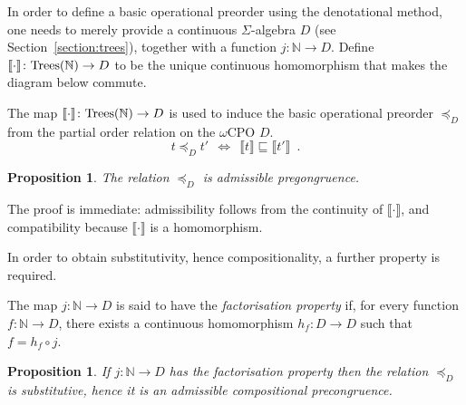 \documentclass[a4paper,UKenglish]{lipics-v2018}
\newcommand{\Trees}{\textnormal{Trees}}
\newcommand{\Basicleq}{\preccurlyeq}
\newcommand{\Sem}[1]{\llbracket #1 \rrbracket}
\theoremstyle{plain}
\newtheorem{proposition}[theorem]{Proposition}
\begin{document}
In order to define a basic operational preorder using the denotational method, one needs to merely provide
a continuous $\Sigma$-algebra $D$ (see Section~\ref{section:trees}),  together with a function
$j\colon \mathbb{N} \to D$. 
Define   $\llbracket \cdot \rrbracket \colon \Trees(\mathbb{N}) \to D$ to be the unique continuous homomorphism that makes the diagram below commute.
   \begin{center}
    \end{center}
\noindent
The map $\llbracket \cdot \rrbracket \colon \Trees(\mathbb{N}) \to D$ is used to induce
the basic operational preorder $\Basicleq_D$ from the partial order relation on the $\omega$CPO $D$.
\[
t \Basicleq_D t' ~~ \Leftrightarrow ~~ \Sem{t} \sqsubseteq \Sem{t' } \enspace .
\]
\begin{proposition}
The relation $\Basicleq_D$ is admissible pregongruence.
\end{proposition}
%
The proof is immediate: admissibility follows from the continuity of 
$\llbracket \cdot \rrbracket$, and compatibility because  $\llbracket \cdot \rrbracket$ is a homomorphism.

In order to obtain substitutivity, hence compositionality, a further property is required.

\begin{definition}
    The map $j\colon \mathbb{N} \to D$ is said to have  the \emph{factorisation property} if,
    for every function $f \colon \mathbb{N} \to D$, there exists a 
    continuous homomorphism $h_{\!f} : D \to D$ such that $f = h_{\!f} \circ j$.
    \begin{center}
    \end{center}
\end{definition}
\begin{proposition}
If $j\colon \mathbb{N} \to D$ has the factorisation property then 
the relation $\Basicleq_D$ is substitutive, hence it is an admissible compositional precongruence.
\end{proposition}
\end{document}
